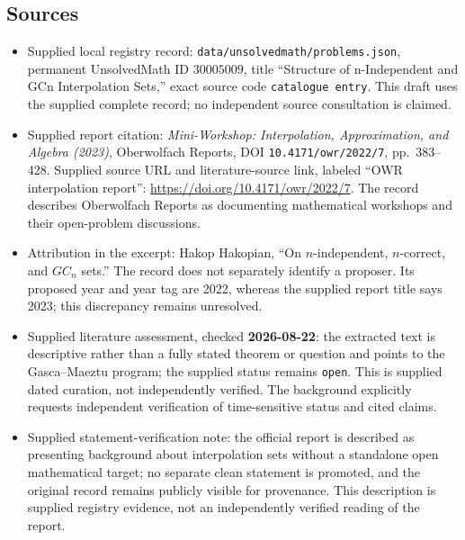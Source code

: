 \documentclass[11pt]{article}
\begin{document}
\subsection{Sources}
\begin{itemize}
\item Supplied local registry record: \texttt{data/unsolvedmath/problems.json}, permanent UnsolvedMath ID \(30005009\), title ``Structure of n-Independent and GCn Interpolation Sets,'' exact source code \texttt{catalogue entry}. This draft uses the supplied complete record; no independent source consultation is claimed.
\item Supplied report citation: \emph{Mini-Workshop: Interpolation, Approximation, and Algebra (2023)}, Oberwolfach Reports, DOI \texttt{10.4171/owr/2022/7}, pp.\ 383--428. Supplied source URL and literature-source link, labeled ``OWR interpolation report'': \url{https://doi.org/10.4171/owr/2022/7}. The record describes Oberwolfach Reports as documenting mathematical workshops and their open-problem discussions.
\item Attribution in the excerpt: Hakop Hakopian, ``On \(n\)-independent, \(n\)-correct, and \(GC_n\) sets.'' The record does not separately identify a proposer. Its proposed year and year tag are 2022, whereas the supplied report title says 2023; this discrepancy remains unresolved.
\item Supplied literature assessment, checked \textbf{2026-08-22}: the extracted text is descriptive rather than a fully stated theorem or question and points to the Gasca--Maeztu program; the supplied status remains \texttt{open}. This is supplied dated curation, not independently verified. The background explicitly requests independent verification of time-sensitive status and cited claims.
\item Supplied statement-verification note: the official report is described as presenting background about interpolation sets without a standalone open mathematical target; no separate clean statement is promoted, and the original record remains publicly visible for provenance. This description is supplied registry evidence, not an independently verified reading of the report.
\end{itemize}
\end{document}

